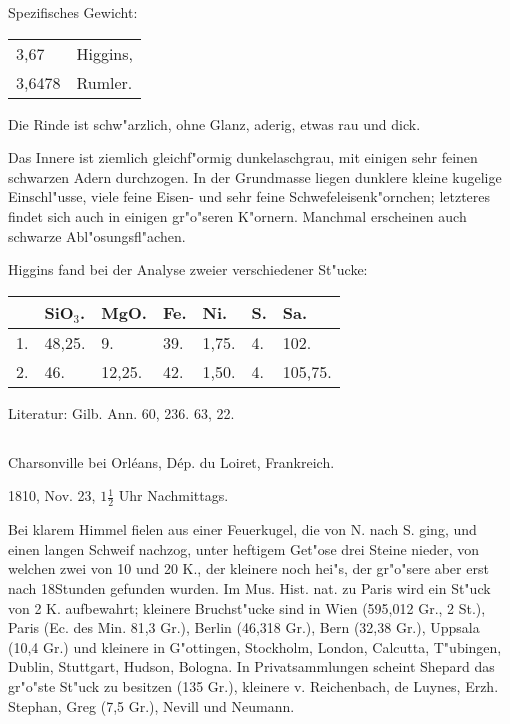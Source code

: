 \documentclass[a4paper, 11pt, oneside]{article}
\begin{document}
Spezifisches Gewicht:
\begin{table}[!ht]
    \centering\swabfamily\Large
    \begin{tabular}{l l}
        3,67 & Higgins,\\
        3,6478 & Rumler.
    \end{tabular}
\end{table}

Die Rinde ist schw"arzlich, ohne Glanz, aderig, etwas rau und dick.

Das Innere ist ziemlich gleichf"ormig dunkelaschgrau, mit einigen sehr feinen schwarzen Adern durchzogen. In der Grundmasse liegen dunklere kleine kugelige Einschl"usse, viele feine Eisen- und sehr feine Schwefeleisenk"ornchen; letzteres findet sich auch in einigen gr"o"seren K"ornern. Manchmal erscheinen auch schwarze Abl"osungsfl"achen.

Higgins fand bei der Analyse zweier verschiedener St"ucke:
\begin{table}[!ht]
    \centering\swabfamily\Large
    \begin{tabular}{l l l l l l l}
         & SiO$_{3}$. & MgO. & Fe. & Ni. & S. & Sa. \\ \hline
        1. & 48,25. & 9. & 39. & 1,75. & 4. & 102. \\
        2. & 46. & 12,25. & 42. & 1,50. & 4. & 105,75. \\
    \end{tabular}
\end{table}

\normalsize
Literatur: Gilb. Ann. 60, 236. 63, 22.
\subsection{}
\LARGE
\paragraph{}
Charsonville bei Orléans, Dép. du Loiret, Frankreich.

1810, Nov. 23, $\mathfrak{1\frac{1}{2}}$ Uhr Nachmittags.

Bei klarem Himmel fielen aus einer Feuerkugel, die von N. nach S. ging, und einen langen Schweif nachzog, unter heftigem Get"ose drei Steine nieder, von welchen zwei von 10 und 20 K., der kleinere noch hei"s, der gr"o"sere aber erst nach 18Stunden gefunden wurden. Im Mus. Hist. nat. zu Paris wird ein St"uck von 2 K. aufbewahrt; kleinere Bruchst"ucke sind in Wien (595,012 Gr., 2 St.), Paris (Ec. des Min. 81,3 Gr.), Berlin (46,318 Gr.), Bern (32,38 Gr.), Uppsala (10,4 Gr.) und kleinere in G"ottingen, Stockholm, London, Calcutta, T"ubingen, Dublin, Stuttgart, Hudson, Bologna. In Privatsammlungen scheint Shepard das gr"o"ste St"uck zu besitzen (135 Gr.), kleinere v. Reichenbach, de Luynes, Erzh. Stephan, Greg (7,5 Gr.), Nevill und Neumann.
\end{document}
